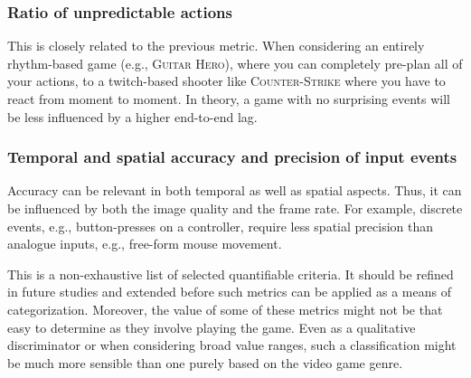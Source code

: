 \subsubsection{Ratio of unpredictable actions} This is closely related to the previous metric. When considering an entirely rhythm-based game (e.g., \textsc{Guitar Hero}), where you can completely pre-plan all of your actions, to a twitch-based shooter like \textsc{Counter-Strike} where you have to react from moment to moment. In theory, a game with no surprising events will be less influenced by a higher end-to-end lag.

\subsubsection{Temporal and spatial accuracy and precision of input events} Accuracy can be relevant in both temporal as well as spatial aspects. Thus, it can be influenced by both the image quality and the frame rate. For example, discrete events, e.g., button-presses on a controller, require less spatial precision than analogue inputs, e.g., free-form mouse movement.

This is a non-exhaustive list of selected quantifiable criteria. It should be refined in future studies and extended before such metrics can be applied as a means of categorization. Moreover, the value of some of these metrics might not be that easy to determine as they involve playing the game. Even as a qualitative discriminator or when considering broad value ranges, such a classification might be much more sensible than one purely based on the video game genre.